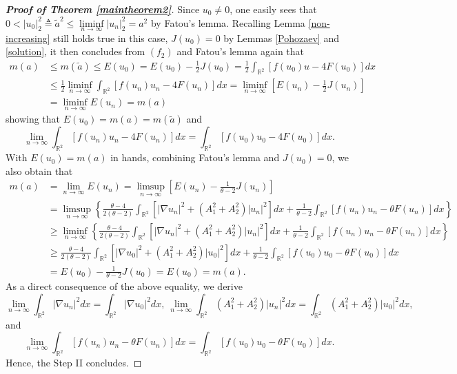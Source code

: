 \documentclass[11pt]{amsart}
\numberwithin{equation}{section}
\theoremstyle{definition}
\newcommand{\R}{\mathbb{R}}
\begin{document}
\begin{proof}[\emph{\textbf{Proof of Theorem \ref{maintheorem2}}}]
Since $u_0\neq0$, one easily sees that $0<|u_0|_2^2\triangleq \tilde{a}^2\leq
\liminf\limits_{n\to\infty}|u_n|^2_2= a^2$ by Fatou's lemma.
Recalling Lemma \ref{non-increasing} still holds true
in this case, $J(u_0)=0$ by Lemmas \ref{Pohozaev} and \ref{solution},
it then concludes
  from $(f_2)$ and Fatou's lemma again that
\begin{align*}
m(a) & \leq m(\tilde{a})\leq E(u_0)=E(u_0)-\frac12J(u_0)= \frac{1}{2}\int_{\R^{2}}\left[f(u_0 )u -4 F(u_0 )\right]dx \\
    & \leq\frac{1}{2}\liminf_{n\to\infty}\int_{\R^{2}}\left[f(u_n)u_n-4 F(u_n)\right]dx=\liminf_{n\to\infty}[E(u_n)-\frac12J(u_n)]\\
    &=\liminf_{n\to\infty} E(u_n)=m(a)
\end{align*}
showing that $E(u_0)=m(a)=m(\tilde{a})$ and
\begin{equation}\label{2proof1}
 \lim_{n\to\infty}\int_{\R^{2}}\left[f(u_n)u_n-4 F(u_n)\right]dx=\int_{\R^{2}}\left[f(u_0 )u_0 -4 F(u_0 )\right]dx.
\end{equation}
With $E(u_0)=m(a)$ in hands, combining Fatou's lemma and $J(u_0)=0$, we also obtain that
\begin{align*}
	  m(a) &=\lim_{n\to\infty}E(u_n)=\limsup_{n\to\infty}[E(u_n)-\frac{1}{\theta-2}J(u_n)] \\
	& =\limsup_{n\to\infty}\left\{ \frac{\theta-4}{2(\theta-2)}
	\int_{\R^2}[|\nabla u_n|^2+(A_1^2+A_2^2)|u_n|^2]dx+\frac{1}{\theta-2}\int_{\R^{2}}\left[f(u_n)u_n-\theta F(u_n)\right]dx\right\}\\
 & \geq \liminf_{n\to\infty}\left\{ \frac{\theta-4}{2(\theta-2)}
\int_{\R^2}[|\nabla u_n|^2+(A_1^2+A_2^2)|u_n|^2]dx+\frac{1}{\theta-2}\int_{\R^{2}}\left[f(u_n)u_n-\theta F(u_n)\right]dx\right\}\\
 &\geq \frac{\theta-4}{2(\theta-2)}\int_{\R^2}[|\nabla u_0 |^2+(A_1^2+A_2^2)|u_0 |^2]dx+\frac{1}{\theta-2}\int_{\R^{2}}\left[f(u_0)u_0-\theta F(u_0)\right]dx\\
&=E(u_0 )-\frac{1}{\theta-2}J(u _0)=E(u_0 )=m(a).
\end{align*}
As a direct consequence of the above equality, we derive
\[
\lim_{n\to\infty}\int_{\R^2} |\nabla u_n|^2 dx
=\int_{\R^2} |\nabla u_0 |^2 dx,~
\lim_{n\to\infty}\int_{\R^2} (A_1^2+A_2^2)|u_n|^2 dx
=\int_{\R^2} (A_1^2+A_2^2)|u_0 |^2dx,
\]
and
\begin{equation}\label{2proof2}
\lim_{n\to\infty}\int_{\R^{2}}\left[f(u_n)u_n-\theta F(u_n)\right]dx=\int_{\R^{2}}\left[f(u_0 )u_0 -\theta F(u_0 )\right]dx.
\end{equation}
Hence, the Step II concludes.


\end{proof}
\end{document}
